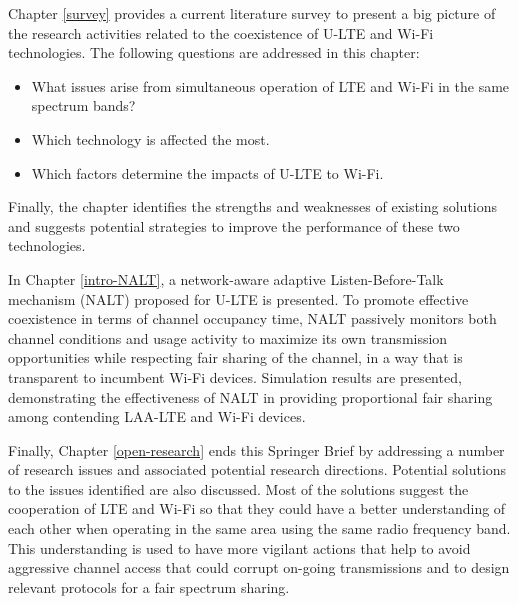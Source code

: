 Chapter \ref{survey} provides a current literature survey to present a big picture of the research activities related to the coexistence of \mbox{U-LTE} and \mbox{Wi-Fi} technologies. The following questions are addressed in this chapter: 
\begin{itemize}
\item What issues arise from simultaneous operation of LTE and \mbox{Wi-Fi} in the same spectrum bands? 
\item Which technology is affected the most. 
\item Which factors determine the impacts of \mbox{U-LTE} to \mbox{Wi-Fi}. 
\end{itemize}Finally, the chapter identifies the strengths and weaknesses of existing solutions and suggests potential strategies to improve the performance of these two technologies.

In Chapter \ref{intro-NALT}, a network-aware adaptive Listen-Before-Talk mechanism (NALT) proposed for \mbox{U-LTE} is presented. To promote effective coexistence in terms of channel occupancy time, NALT passively monitors both channel conditions and usage activity to maximize its own transmission opportunities while respecting fair sharing of the channel, in a way that is transparent to incumbent \mbox{Wi-Fi} devices. Simulation results are presented, demonstrating the effectiveness of NALT in providing proportional fair sharing among contending \mbox{LAA-LTE} and \mbox{Wi-Fi} devices.

Finally, Chapter \ref{open-research} ends this Springer Brief by addressing a number of research issues and associated potential research directions. Potential solutions to the issues identified are also discussed. Most of the solutions suggest the cooperation of LTE and \mbox{Wi-Fi} so that they could have a better understanding of each other when operating in the same area using the same radio frequency band. This understanding is used to have more vigilant actions that help to avoid aggressive channel access that could corrupt on-going transmissions and to design relevant protocols for a fair spectrum sharing.


